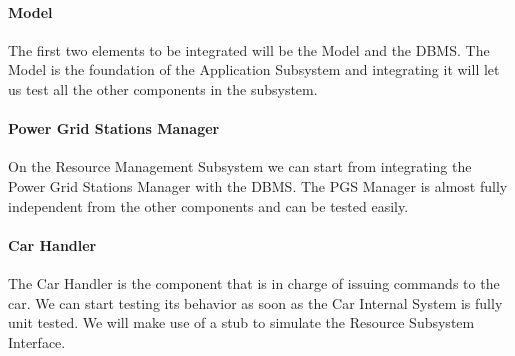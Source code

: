 \documentclass[english]{article}
\begin{document}
\paragraph{Model}
The first two elements to be integrated will be the Model and the DBMS.
The Model is the foundation of the Application Subsystem and integrating it will let us test all the other components in the subsystem.

\begin{figure}[H]
	\centering
\end{figure}

\paragraph{Power Grid Stations Manager}
On the Resource Management Subsystem we can start from integrating the Power Grid Stations Manager with the DBMS. 
The PGS Manager is almost fully independent from the other components and can be tested easily.
\begin{figure}[H]
	\centering
\end{figure}

\paragraph{Car Handler}
The Car Handler is the component that is in charge of issuing commands to the car. We can start testing its behavior as soon as the Car Internal System is fully unit tested. We will make use of a stub to simulate the Resource Subsystem Interface.

\begin{figure}[H]
	\centering
\end{figure}
\end{document}
